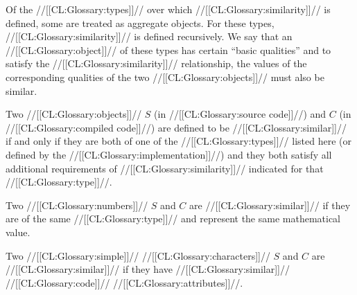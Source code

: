 

Of the //[[CL:Glossary:types]]// over which //[[CL:Glossary:similarity]]// is defined, 
some are treated as aggregate objects.  For these types, 
//[[CL:Glossary:similarity]]// is defined recursively.  
We say that an //[[CL:Glossary:object]]// of these types has certain ``basic qualities''
and to satisfy the //[[CL:Glossary:similarity]]// relationship, the values of the
corresponding qualities of the two //[[CL:Glossary:objects]]// must also be similar.
 
\endsubsubsubsection%





































Two //[[CL:Glossary:objects]]// $S$ (in //[[CL:Glossary:source code]]//) and $C$ (in //[[CL:Glossary:compiled code]]//)
     are defined to be //[[CL:Glossary:similar]]// if and only if 
     they are both of one of the //[[CL:Glossary:types]]// listed here
      (or defined by the //[[CL:Glossary:implementation]]//) 
 and they both satisfy all additional requirements of //[[CL:Glossary:similarity]]// 
      indicated for that //[[CL:Glossary:type]]//.

\beginlist

 
Two //[[CL:Glossary:numbers]]// $S$ and $C$ are //[[CL:Glossary:similar]]// if they are of the same //[[CL:Glossary:type]]//
and represent the same mathematical value.

 






Two //[[CL:Glossary:simple]]// //[[CL:Glossary:characters]]// $S$ and $C$ are //[[CL:Glossary:similar]]// 
if they have //[[CL:Glossary:similar]]// //[[CL:Glossary:code]]// //[[CL:Glossary:attributes]]//.

